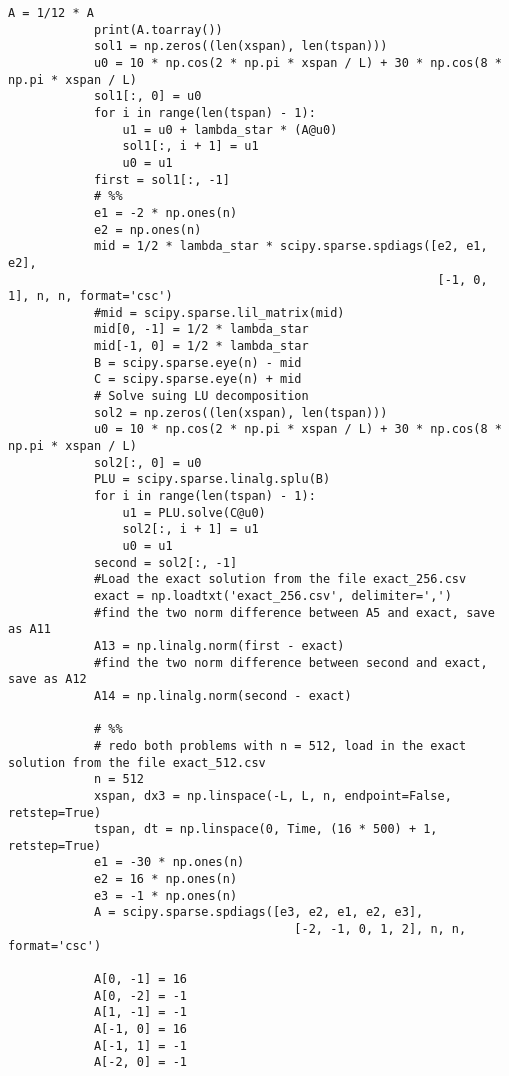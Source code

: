 \documentclass[a4paper,12pt, fleqn]{article}
\begin{document}
\begin{enumerate}
\begin{lstlisting}[basicstyle=\tiny]
            A = 1/12 * A
            print(A.toarray())
            sol1 = np.zeros((len(xspan), len(tspan)))
            u0 = 10 * np.cos(2 * np.pi * xspan / L) + 30 * np.cos(8 * np.pi * xspan / L)
            sol1[:, 0] = u0
            for i in range(len(tspan) - 1):
                u1 = u0 + lambda_star * (A@u0)
                sol1[:, i + 1] = u1 
                u0 = u1
            first = sol1[:, -1]
            # %%
            e1 = -2 * np.ones(n)
            e2 = np.ones(n)
            mid = 1/2 * lambda_star * scipy.sparse.spdiags([e2, e1, e2],
                                                            [-1, 0, 1], n, n, format='csc')
            #mid = scipy.sparse.lil_matrix(mid)
            mid[0, -1] = 1/2 * lambda_star
            mid[-1, 0] = 1/2 * lambda_star
            B = scipy.sparse.eye(n) - mid
            C = scipy.sparse.eye(n) + mid
            # Solve suing LU decomposition
            sol2 = np.zeros((len(xspan), len(tspan)))
            u0 = 10 * np.cos(2 * np.pi * xspan / L) + 30 * np.cos(8 * np.pi * xspan / L)
            sol2[:, 0] = u0
            PLU = scipy.sparse.linalg.splu(B)
            for i in range(len(tspan) - 1):
                u1 = PLU.solve(C@u0)
                sol2[:, i + 1] = u1
                u0 = u1
            second = sol2[:, -1]
            #Load the exact solution from the file exact_256.csv
            exact = np.loadtxt('exact_256.csv', delimiter=',')
            #find the two norm difference between A5 and exact, save as A11
            A13 = np.linalg.norm(first - exact)
            #find the two norm difference between second and exact, save as A12
            A14 = np.linalg.norm(second - exact)

            # %%
            # redo both problems with n = 512, load in the exact solution from the file exact_512.csv
            n = 512
            xspan, dx3 = np.linspace(-L, L, n, endpoint=False, retstep=True)
            tspan, dt = np.linspace(0, Time, (16 * 500) + 1, retstep=True)
            e1 = -30 * np.ones(n)
            e2 = 16 * np.ones(n)
            e3 = -1 * np.ones(n)
            A = scipy.sparse.spdiags([e3, e2, e1, e2, e3],
                                        [-2, -1, 0, 1, 2], n, n, format='csc')

            A[0, -1] = 16
            A[0, -2] = -1
            A[1, -1] = -1
            A[-1, 0] = 16
            A[-1, 1] = -1
            A[-2, 0] = -1


\end{lstlisting}
\end{enumerate}
\end{document}
